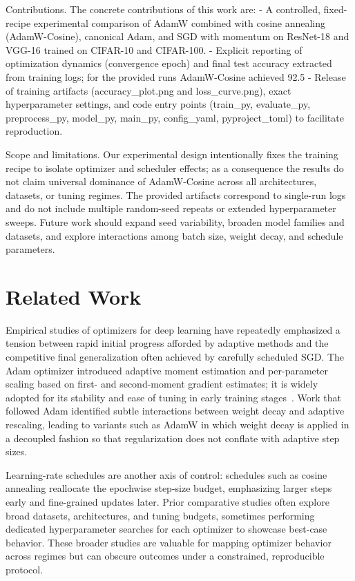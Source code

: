 \documentclass[journal,article,submit,pdftex,moreauthors]{Definitions/mdpi}
\begin{document}
Contributions. The concrete contributions of this work are:
- A controlled, fixed-recipe experimental comparison of AdamW combined with cosine annealing (AdamW-Cosine), canonical Adam, and SGD with momentum on ResNet-18 and VGG-16 trained on CIFAR-10 and CIFAR-100.
- Explicit reporting of optimization dynamics (convergence epoch) and final test accuracy extracted from training logs; for the provided runs AdamW-Cosine achieved 92.5%
- Release of training artifacts (accuracy\_plot.png and loss\_curve.png), exact hyperparameter settings, and code entry points (train\_py, evaluate\_py, preprocess\_py, model\_py, main\_py, config\_yaml, pyproject\_toml) to facilitate reproduction.

Scope and limitations. Our experimental design intentionally fixes the training recipe to isolate optimizer and scheduler effects; as a consequence the results do not claim universal dominance of AdamW-Cosine across all architectures, datasets, or tuning regimes. The provided artifacts correspond to single-run logs and do not include multiple random-seed repeats or extended hyperparameter sweeps. Future work should expand seed variability, broaden model families and datasets, and explore interactions among batch size, weight decay, and schedule parameters.

\section{Related Work}

Empirical studies of optimizers for deep learning have repeatedly emphasized a tension between rapid initial progress afforded by adaptive methods and the competitive final generalization often achieved by carefully scheduled SGD\@. The Adam optimizer introduced adaptive moment estimation and per-parameter scaling based on first- and second-moment gradient estimates; it is widely adopted for its stability and ease of tuning in early training stages~\cite{kingma-2014-adam}. Work that followed Adam identified subtle interactions between weight decay and adaptive rescaling, leading to variants such as AdamW in which weight decay is applied in a decoupled fashion so that regularization does not conflate with adaptive step sizes.

Learning-rate schedules are another axis of control: schedules such as cosine annealing reallocate the epochwise step-size budget, emphasizing larger steps early and fine-grained updates later. Prior comparative studies often explore broad datasets, architectures, and tuning budgets, sometimes performing dedicated hyperparameter searches for each optimizer to showcase best-case behavior. These broader studies are valuable for mapping optimizer behavior across regimes but can obscure outcomes under a constrained, reproducible protocol.
\end{document}
